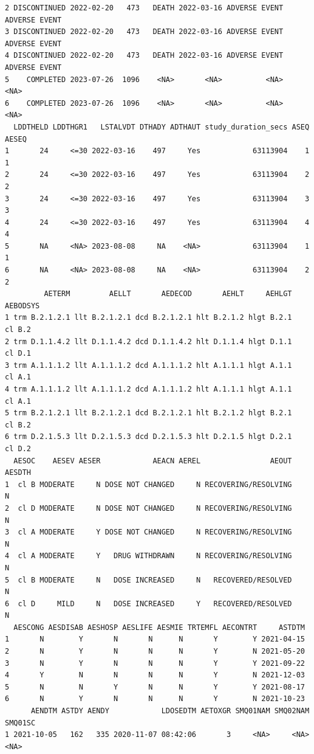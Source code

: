 \documentclass[
  letterpaper,
  DIV=11,
  numbers=noendperiod]{scrreprt}
\begin{document}
\begin{verbatim}
2 DISCONTINUED 2022-02-20   473   DEATH 2022-03-16 ADVERSE EVENT ADVERSE EVENT
3 DISCONTINUED 2022-02-20   473   DEATH 2022-03-16 ADVERSE EVENT ADVERSE EVENT
4 DISCONTINUED 2022-02-20   473   DEATH 2022-03-16 ADVERSE EVENT ADVERSE EVENT
5    COMPLETED 2023-07-26  1096    <NA>       <NA>          <NA>          <NA>
6    COMPLETED 2023-07-26  1096    <NA>       <NA>          <NA>          <NA>
  LDDTHELD LDDTHGR1   LSTALVDT DTHADY ADTHAUT study_duration_secs ASEQ AESEQ
1       24     <=30 2022-03-16    497     Yes            63113904    1     1
2       24     <=30 2022-03-16    497     Yes            63113904    2     2
3       24     <=30 2022-03-16    497     Yes            63113904    3     3
4       24     <=30 2022-03-16    497     Yes            63113904    4     4
5       NA     <NA> 2023-08-08     NA    <NA>            63113904    1     1
6       NA     <NA> 2023-08-08     NA    <NA>            63113904    2     2
         AETERM         AELLT       AEDECOD       AEHLT     AEHLGT AEBODSYS
1 trm B.2.1.2.1 llt B.2.1.2.1 dcd B.2.1.2.1 hlt B.2.1.2 hlgt B.2.1   cl B.2
2 trm D.1.1.4.2 llt D.1.1.4.2 dcd D.1.1.4.2 hlt D.1.1.4 hlgt D.1.1   cl D.1
3 trm A.1.1.1.2 llt A.1.1.1.2 dcd A.1.1.1.2 hlt A.1.1.1 hlgt A.1.1   cl A.1
4 trm A.1.1.1.2 llt A.1.1.1.2 dcd A.1.1.1.2 hlt A.1.1.1 hlgt A.1.1   cl A.1
5 trm B.2.1.2.1 llt B.2.1.2.1 dcd B.2.1.2.1 hlt B.2.1.2 hlgt B.2.1   cl B.2
6 trm D.2.1.5.3 llt D.2.1.5.3 dcd D.2.1.5.3 hlt D.2.1.5 hlgt D.2.1   cl D.2
  AESOC    AESEV AESER            AEACN AEREL                AEOUT AESDTH
1  cl B MODERATE     N DOSE NOT CHANGED     N RECOVERING/RESOLVING      N
2  cl D MODERATE     N DOSE NOT CHANGED     N RECOVERING/RESOLVING      N
3  cl A MODERATE     Y DOSE NOT CHANGED     N RECOVERING/RESOLVING      N
4  cl A MODERATE     Y   DRUG WITHDRAWN     N RECOVERING/RESOLVING      N
5  cl B MODERATE     N   DOSE INCREASED     N   RECOVERED/RESOLVED      N
6  cl D     MILD     N   DOSE INCREASED     Y   RECOVERED/RESOLVED      N
  AESCONG AESDISAB AESHOSP AESLIFE AESMIE TRTEMFL AECONTRT     ASTDTM
1       N        Y       N       N      N       Y        Y 2021-04-15
2       N        Y       N       N      N       Y        N 2021-05-20
3       N        Y       N       N      N       Y        Y 2021-09-22
4       Y        N       N       N      N       Y        N 2021-12-03
5       N        N       Y       N      N       Y        Y 2021-08-17
6       N        Y       N       N      N       Y        N 2021-10-23
      AENDTM ASTDY AENDY            LDOSEDTM AETOXGR SMQ01NAM SMQ02NAM SMQ01SC
1 2021-10-05   162   335 2020-11-07 08:42:06       3     <NA>     <NA>    <NA>

\end{verbatim}
\end{document}
